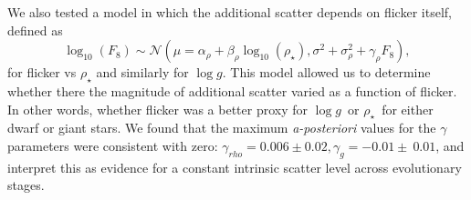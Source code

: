 \documentclass[apjl]{emulateapj}
\newcommand{\logg}{$\log g$}
\newcommand{\rhostar}{$\rho_{\star}$}
\begin{document}
We also tested a model in which the additional scatter depends on flicker
itself, defined as
\begin{equation}
	\log_{10}(F_8) \sim \mathcal{N} \left(\mu = \alpha_\rho +
    \beta_\rho \log_{10}(\rho_\star), \sigma^2 + \sigma_{\rho}^2 +
    \gamma_\rho F_8 \right),
\end{equation}
\label{eq:rho2}
for flicker vs $\rho_\star$ and similarly for \logg.
This model allowed us to determine whether there the magnitude of additional
scatter varied as a function of flicker.
In other words, whether flicker was a better proxy for \logg\ or \rhostar\ for
either dwarf or giant stars.
We found that the maximum {\it a-posteriori} values for the $\gamma$
parameters were consistent with zero: $\gamma_{rho} = 0.006 \pm 0.02, \gamma_g
= -0.01 \pm\ 0.01$, and interpret this as evidence for a constant intrinsic
scatter level across evolutionary stages.
\end{document}
